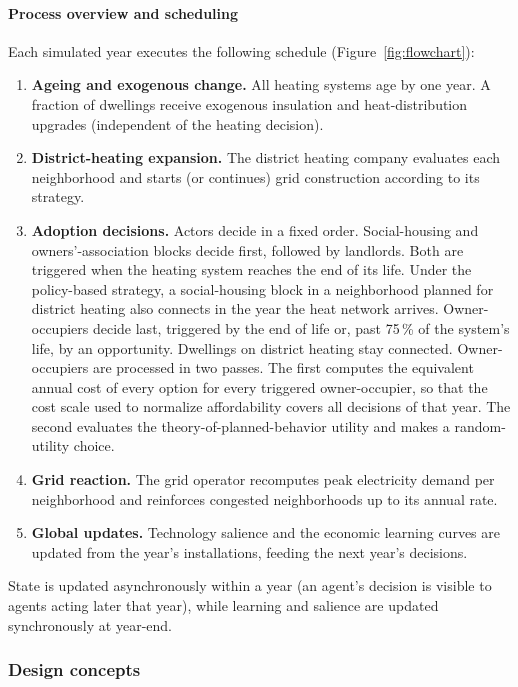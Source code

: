 \documentclass[preprint,12pt,authoryear]{elsarticle}
\begin{document}
\paragraph{Process overview and scheduling}
Each simulated year executes the following schedule
(Figure~\ref{fig:flowchart}):
\begin{enumerate}\itemsep2pt
  \item \textbf{Ageing and exogenous change.} All heating systems age by one
    year. A fraction of dwellings receive exogenous insulation and
    heat-distribution upgrades (independent of the heating decision).
  \item \textbf{District-heating expansion.} The district heating company
    evaluates each neighborhood and starts (or continues) grid construction
    according to its strategy.
  \item \textbf{Adoption decisions.} Actors decide in a fixed order.
    Social-housing and owners'-association blocks decide first, followed by
    landlords. Both are triggered when the heating system reaches the end of
    its life. Under the policy-based strategy, a social-housing block in a
    neighborhood planned for district heating also connects in the year the
    heat network arrives. Owner-occupiers decide last, triggered by the end
    of life or, past 75\,\% of the system's life, by an opportunity.
    Dwellings on district heating stay connected. Owner-occupiers are
    processed in two passes. The first computes the equivalent annual cost
    of every option for every triggered owner-occupier, so that the cost
    scale used to normalize affordability covers all decisions of that year.
    The second evaluates the theory-of-planned-behavior utility and makes a
    random-utility choice.
  \item \textbf{Grid reaction.} The grid operator recomputes peak electricity
    demand per neighborhood and reinforces congested neighborhoods up to its
    annual rate.
  \item \textbf{Global updates.} Technology salience and the economic
    learning curves are updated from the year's installations, feeding the
    next year's decisions.
\end{enumerate}
State is updated asynchronously within a year (an agent's decision is visible
to agents acting later that year), while learning and salience are updated
synchronously at year-end.

\subsubsection{Design concepts}
\end{document}
